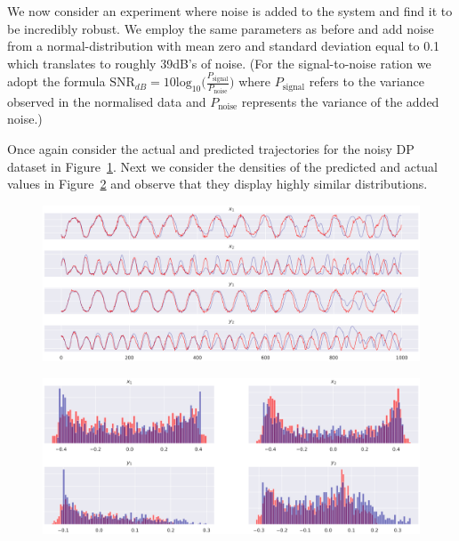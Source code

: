 \documentclass[a4paper,12pt,twoside]{report}
\begin{document}
We now consider an experiment where noise is added to the system and find it to be incredibly robust. We employ the same parameters as before and add noise from a normal-distribution with mean zero and standard deviation equal to 0.1 which translates to roughly 39dB's of noise.
(For the signal-to-noise ration we adopt the formula $\text{SNR}_{dB}=10\text{log}_{10}\big(\frac{P_\text{{signal}}}{P_{\text{noise}}}\big)$ where $P_\text{{signal}}$ refers to the variance observed in the normalised data and $P_{\text{noise}}$ represents the variance of the added noise.)

Once again consider the actual and predicted trajectories for the noisy DP dataset in Figure~\ref{fig:noisydp_success_traj}. Next we consider the densities of the predicted and actual values in Figure~\ref{fig:noisydp_success_density} and observe that they display highly similar distributions.

\begin{figure}[ht]
  \centering
  \includegraphics[width=0.95\linewidth]{_dp_noise_FigCD_2030.eps} 
  \label{fig:noisydp_success_traj}
\end{figure}
\begin{figure}[ht]
  \centering
  \includegraphics[width=\linewidth]{_dp_noise_2B_2030.eps}
  \label{fig:noisydp_success_density}
 \end{figure}
\end{document}
